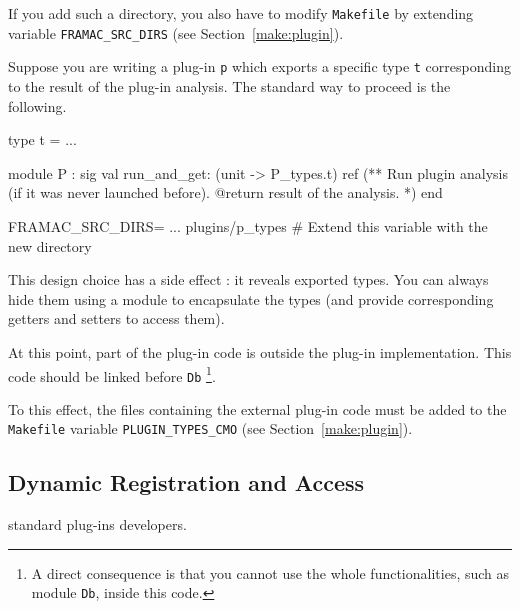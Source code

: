 If you add such a directory, you also have to modify \texttt{Makefile} by
extending variable \texttt{FRAMAC\_SRC\_DIRS} (see
Section~\ref{make:plugin}).
\begin{example}
Suppose you are writing a plug-in \texttt{p} which exports a specific type
\texttt{t} corresponding to the result of the plug-in analysis. The standard way
to proceed is the following.

\begin{ocamlcode}
type t = ...
\end{ocamlcode}

\begin{ocamlcode}
module P : sig
  val run_and_get: (unit -> P_types.t) ref
     (** Run plugin analysis (if it was never launched before).
         @return result of the analysis. *)
end
\end{ocamlcode}

\begin{makefilecode}
FRAMAC_SRC_DIRS= ... plugins/p_types
   # Extend this variable with the new directory
\end{makefilecode}
\end{example}

This design choice has a side effect : it reveals exported types.
You can always hide them using a module to encapsulate the types
(and provide corresponding getters and setters to access them).

At this point, part of the plug-in code is outside the plug-in
implementation. This code should be linked before \texttt{Db}
\footnote{A direct consequence is that you cannot use the whole
\framac functionalities, such as module \texttt{Db}, inside this code.}.

To this effect, the files containing the external plug-in code must be added to
the \texttt{Makefile} variable
\texttt{PLUGIN\_TYPES\_CMO} (see
Section~\ref{make:plugin}).

\subsection{Dynamic Registration and Access}
\label{adv:dynamic-registration}

\begin{target}standard plug-ins developers.\end{target}

